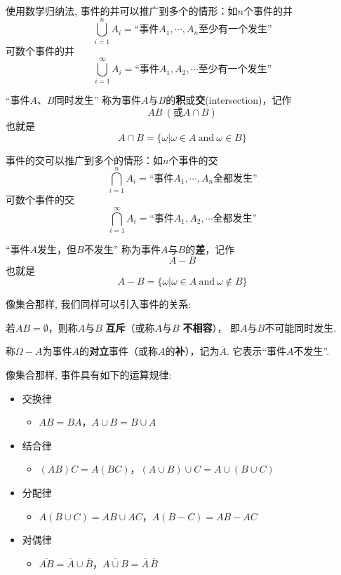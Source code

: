 \begin{remark}
    使用数学归纳法, 事件的并可以推广到多个的情形：如$n$个事件的并
    $$\bigcup_{i=1}^{n} A_i =\text{“事件$A_1, \cdots, A_n$至少有一个发生”}$$
    可数个事件的并
    $$\bigcup_{i=1}^{\infty} A_i =\text{“事件$A_1, A_2, \cdots$至少有一个发生”}$$
\end{remark}

\begin{definition}
        “事件$A$、$B$同时发生”
    称为事件$A$与$B$的\textbf{积}或\textbf{交}(intersection)，记作
    $$AB \ (\text{或}A\cap B)$$
    也就是$$A\cap B=\{\omega | \omega\in A \ \text{and}\ \omega\in B\}$$
\end{definition}

\begin{remark}
    事件的交可以推广到多个的情形：如$n$个事件的交
    $$\bigcap_{i=1}^{n} A_i =\text{“事件$A_1, \cdots, A_n$全都发生”}$$
    可数个事件的交
    $$\bigcap_{i=1}^{\infty} A_i =\text{“事件$A_1, A_2, \cdots$全都发生”}$$
\end{remark}

\begin{definition}
    “事件$A$发生，但$B$不发生”
称为事件$A$与$B$的\textbf{差}，记作
$$A-B$$
也就是
$$A- B=\{\omega | \omega\in A \ \text{and}\ \omega\notin B\}$$
\end{definition}

像集合那样, 我们同样可以引入事件的关系: 

\begin{definition}
    若$AB=\emptyset$，则称$A$与$B$ \textbf{互斥}（或称$A$与$B$ \textbf{不相容}），%
    即$A$与$B$不可能同时发生. 
\end{definition}

\begin{definition}
    称$\Omega-A$为事件$A$的\textbf{对立}事件（或称$A$的\textbf{补}），记为$\overline{A}$. 
    它表示“事件$A$不发生”. 
\end{definition}


像集合那样, 事件具有如下的运算规律: 
\begin{itemize}
    \item 交换律
    \begin{itemize}
        \item $AB=BA$，$A\cup B=B\cup A$
    \end{itemize}
    \item 结合律
    \begin{itemize}
        \item $(AB)C=A(BC)$，$(A\cup B)\cup C=A\cup(B\cup C)$
    \end{itemize}
    \item 分配律
    \begin{itemize}
        \item $A(B\cup C)=AB\cup AC$，$A(B-C)=AB-AC$
    \end{itemize}
    \item 对偶律
    \begin{itemize}
        \item $\overline{AB}=\overline{A}\cup\overline{B}$，$\overline{A\cup B}=\overline{A}\,\overline{B}$
    \end{itemize}
\end{itemize}


